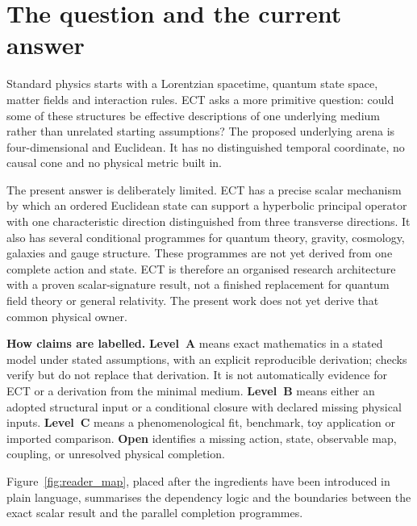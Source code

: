 \documentclass[11pt,a4paper]{article}
\newcommand{\statA}{\textbf{Level~A}}
\newcommand{\statB}{\textbf{Level~B}}
\newcommand{\statC}{\textbf{Level~C}}
\newcommand{\statO}{\textbf{Open}}
\begin{document}
\section{The question and the current answer}
\label{sec:question}

Standard physics starts with a Lorentzian spacetime, quantum state space,
matter fields and interaction rules.  ECT asks a more primitive question:
could some of these structures be effective descriptions of one underlying
medium rather than unrelated starting assumptions?  The proposed underlying
arena is four-dimensional and Euclidean.  It has no distinguished temporal
coordinate, no causal cone and no physical metric built in.

The present answer is deliberately limited.  ECT has a precise scalar
mechanism by which an ordered Euclidean state can support a hyperbolic
principal operator with one characteristic direction distinguished from
three transverse directions.  It also has several conditional programmes for
quantum theory, gravity, cosmology, galaxies and gauge structure.  These
programmes are not yet derived from one complete action and state.  ECT is
therefore an organised research architecture with a proven scalar-signature
result, not a finished replacement for quantum field theory or general
relativity.  The present work does not yet derive that common physical owner.

\begin{statusbox}
\textbf{How claims are labelled.}
\statA{} means exact mathematics in a stated model under stated assumptions,
with an explicit reproducible derivation; checks verify but do not replace that
derivation.  It is not automatically evidence for ECT or a derivation from the
minimal medium.  \statB{} means either an adopted structural input or a conditional
closure with declared missing physical inputs.  \statC{} means a
phenomenological fit, benchmark,
toy application or imported comparison.  \statO{} identifies a missing
action, state, observable map, coupling, or unresolved physical completion.
\end{statusbox}

Figure~\ref{fig:reader_map}, placed after the ingredients have been introduced
in plain language, summarises the dependency logic and the boundaries between
the exact scalar result and the parallel completion programmes.
\end{document}
